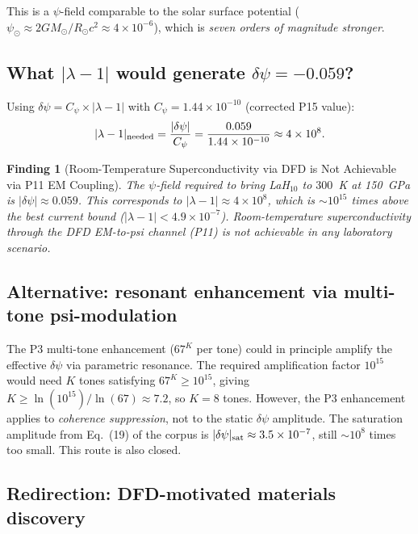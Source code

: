 \documentclass[11pt]{article}
\newtheorem{finding}{Finding}
\newcommand{\ee}[1]{\times 10^{#1}}
\begin{document}
This is a $\psi$-field comparable to the solar surface potential
($\psi_\odot \approx 2GM_\odot/R_\odot c^2 \approx 4\ee{-6}$),
which is \emph{seven orders of magnitude stronger}.

\subsection{What $|\lambda-1|$ would generate $\delta\psi = -0.059$?}

Using $\delta\psi = C_\psi \times |\lambda-1|$ with $C_\psi = 1.44\ee{-10}$
(corrected P15 value):
\begin{equation}
|\lambda-1|_{\rm needed} = \frac{|\delta\psi|}{C_\psi}
= \frac{0.059}{1.44\ee{-10}} \approx 4\ee{8}.
\label{eq:lambda-needed}
\end{equation}

\begin{finding}[Room-Temperature Superconductivity via DFD is Not Achievable
via P11 EM Coupling]
The $\psi$-field required to bring LaH$_{10}$ to $300$~K at 150~GPa
is $|\delta\psi| \approx 0.059$. This corresponds to $|\lambda-1| \approx 4\ee{8}$,
which is $\sim 10^{15}$ times above the best current bound
($|\lambda-1| < 4.9\ee{-7}$). Room-temperature superconductivity through
the DFD EM-to-psi channel (P11) is not achievable in any laboratory scenario.
\end{finding}

\subsection{Alternative: resonant enhancement via multi-tone psi-modulation}

The P3 multi-tone enhancement ($67^K$ per tone) could in principle amplify the
effective $\delta\psi$ via parametric resonance. The required amplification
factor $10^{15}$ would need $K$ tones satisfying $67^K \geq 10^{15}$, giving
$K \geq \ln(10^{15})/\ln(67) \approx 7.2$, so $K = 8$ tones. However, the
P3 enhancement applies to \emph{coherence suppression}, not to
the static $\delta\psi$ amplitude. The saturation amplitude from Eq.~(19) of the
corpus is $|\delta\psi|_{\rm sat} \approx 3.5\ee{-7}$, still $\sim 10^{8}$
times too small. This route is also closed.

\subsection{Redirection: DFD-motivated materials discovery}
\end{document}
